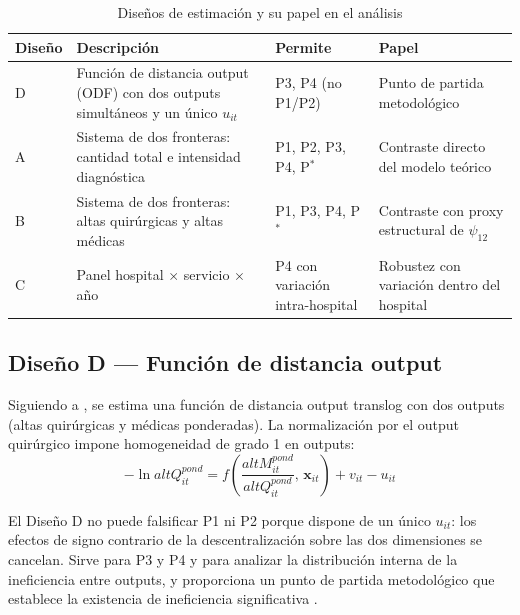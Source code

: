 \documentclass[12pt, a4paper, twoside, openright]{book}
\theoremstyle{plain}
\theoremstyle{definition}
\theoremstyle{remark}
\begin{document}
\begin{table}[htbp]
\centering
\caption{Diseños de estimación y su papel en el análisis}
\label{tab:disenos}
\begin{threeparttable}
\small
\begin{tabular}{p{1.2cm}p{3.5cm}p{2.5cm}p{3.5cm}}
\toprule
\textbf{Diseño} & \textbf{Descripción} &
\textbf{Permite} & \textbf{Papel} \\
\midrule
D & Función de distancia output (ODF) con dos outputs simultáneos y un único $u_{it}$
  & P3, P4 (no P1/P2)
  & Punto de partida metodológico \\[6pt]
A & Sistema de dos fronteras: cantidad total e intensidad diagnóstica
  & P1, P2, P3, P4, P$^*$
  & Contraste directo del modelo teórico \\[6pt]
B & Sistema de dos fronteras: altas quirúrgicas y altas médicas
  & P1, P3, P4, P$^*$
  & Contraste con proxy estructural de $\psi_{12}$ \\[6pt]
C & Panel hospital $\times$ servicio $\times$ año
  & P4 con variación intra-hospital
  & Robustez con variación dentro del hospital \\
\bottomrule
\end{tabular}
\end{threeparttable}
\end{table}

\subsection{Diseño D --- Función de distancia output}

Siguiendo a \citet{coelli1999}, se estima una función de distancia output translog con dos outputs (altas quirúrgicas y médicas ponderadas). La normalización por el output quirúrgico impone homogeneidad de grado 1 en outputs:
\begin{equation}
  -\ln altQ^{pond}_{it} = f\!\left(\frac{altM^{pond}_{it}}{altQ^{pond}_{it}},\, \mathbf{x}_{it}\right) + v_{it} - u_{it}
  \label{eq:odf}
\end{equation}

El Diseño D no puede falsificar P1 ni P2 porque dispone de un único $u_{it}$: los efectos de signo contrario de la descentralización sobre las dos dimensiones se cancelan. Sirve para P3 y P4 y para analizar la distribución interna de la ineficiencia entre outputs, y proporciona un punto de partida metodológico que establece la existencia de ineficiencia significativa \citep{coelli2005}.
\end{document}
